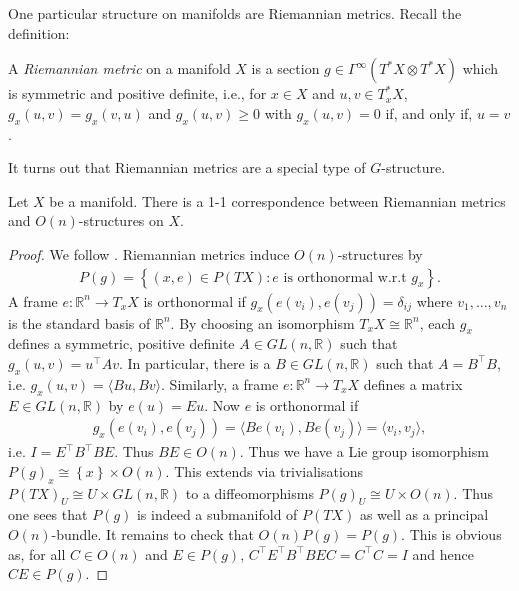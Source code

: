 \documentclass{article}
\begin{document}
One particular structure on manifolds are Riemannian metrics. Recall the
definition:

\begin{definition}
  A \emph{Riemannian metric} on a manifold $X$ is a section
  $g\in\Gamma^\infty(T^*X\otimes T^*X)$ which is symmetric and positive
  definite, i.e., for $x\in X$ and $u,v\in T^*_x X$,
  $g_x(u,v)=g_x(v,u)$ and $g_x(u,v)\geq 0$ with $g_x(u,v)=0$
  if, and only if, $u=v$.
\end{definition}

It turns out that Riemannian metrics are a special type of $G$-structure.

\begin{theorem}\label{thm:metrics_are_structures}
  Let $X$ be a manifold. There is a 1-1 correspondence between Riemannian
  metrics and $O(n)$-structures on $X$.
  \begin{proof}
    We follow \cite{cap2021}. Riemannian metrics induce $O(n)$-structures by
    \begin{align*}
      P(g) = \left\lbrace{(x,e) \in P(TX) : \text{$e$ is orthonormal w.r.t $g_x$}}\right\rbrace.
    \end{align*}
    A frame $e:\mathbb{R}^n\to T_x X$ is orthonormal if $g_x(e(v_i),e(v_j))=\delta_{ij}$ where $v_1,\ldots,v_n$ is the standard basis of $\mathbb{R}^n$.
    By choosing an isomorphism $T_x X \cong \mathbb{R}^n$, each $g_x$ defines
    a symmetric, positive definite $A\in GL(n,\mathbb{R})$ such that $g_x(u,v)=u^\top A v$. In particular, there is a $B\in GL(n,\mathbb{R})$ such that
    $A=B^\top B$, i.e. $g_x(u,v)=\langle Bu,Bv\rangle$.
    Similarly, a frame $e:\mathbb{R}^n\to T_x X$ defines
    a matrix $E\in GL(n,\mathbb{R})$ by $e(u) = Eu$. Now $e$ is orthonormal if
    \begin{align*}
      g_x(e(v_i),e(v_j)) = \langle Be(v_i), Be(v_j)\rangle = \langle v_i, v_j \rangle,
    \end{align*}
    i.e. $I=E^\top B^\top B E$. Thus $BE\in O(n)$. Thus
    we have a Lie group isomorphism $P(g)_x \cong\left\lbrace{x}\right\rbrace\times O(n)$. This
    extends via trivialisations $P(TX)_U \cong U\times GL(n,\mathbb{R})$
    to a diffeomorphisms $P(g)_U \cong U\times O(n)$. Thus one sees that
    $P(g)$ is indeed a submanifold of $P(TX)$ as well as a principal
    $O(n)$-bundle. It remains to check that $O(n)P(g)=P(g)$. This is
    obvious as, for all $C\in O(n)$ and $E\in P(g)$,
    $C^\top E^\top B^\top BEC = C^\top C = I$ and hence $CE\in P(g)$.


\end{proof}
\end{theorem}
\end{document}

